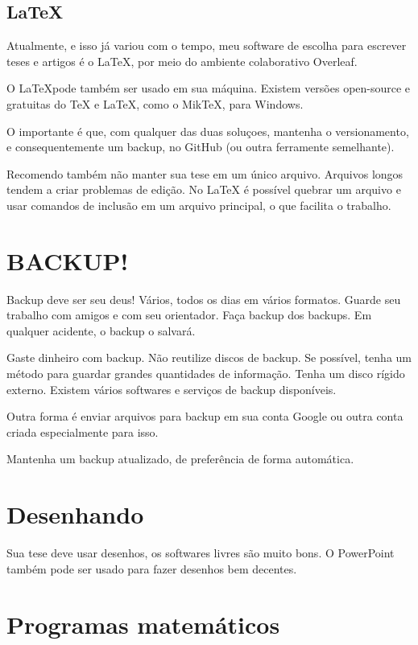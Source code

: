 \subsection{\LaTeX}

Atualmente, e isso já variou com o tempo, meu software de escolha para escrever teses e artigos é o \LaTeX, por meio do ambiente colaborativo Overleaf. 

O \LaTeX pode também ser usado em sua máquina. Existem versões open-source e gratuitas do TeX e LaTeX, como o MikTeX, para Windows. 

O importante é que, com qualquer das duas soluçoes, mantenha o versionamento, e consequentemente um backup, no GitHub (ou outra ferramente semelhante).

Recomendo também não manter sua tese em um único arquivo. Arquivos longos tendem a criar problemas de edição. No LaTeX é possível quebrar um arquivo e usar comandos de inclusão em um arquivo principal, o que facilita o trabalho. 

\section{BACKUP!}

Backup deve ser seu deus! 
Vários, todos os dias em vários formatos. Guarde seu trabalho com amigos e com seu orientador. Faça backup dos backups. Em qualquer acidente, o backup o salvará. 

Gaste dinheiro com backup. Não reutilize discos de backup. Se possível, tenha um método para guardar grandes quantidades de informação. Tenha um disco rígido externo. 
Existem vários softwares e serviços de backup disponíveis. 

Outra forma é enviar arquivos para backup em sua conta Google ou outra conta criada especialmente para isso.

Mantenha um backup atualizado, de preferência de forma automática.




\section{Desenhando}

Sua tese deve usar desenhos, os softwares livres são muito bons. O PowerPoint também pode ser usado para fazer desenhos bem decentes.

\section{Programas matemáticos}

